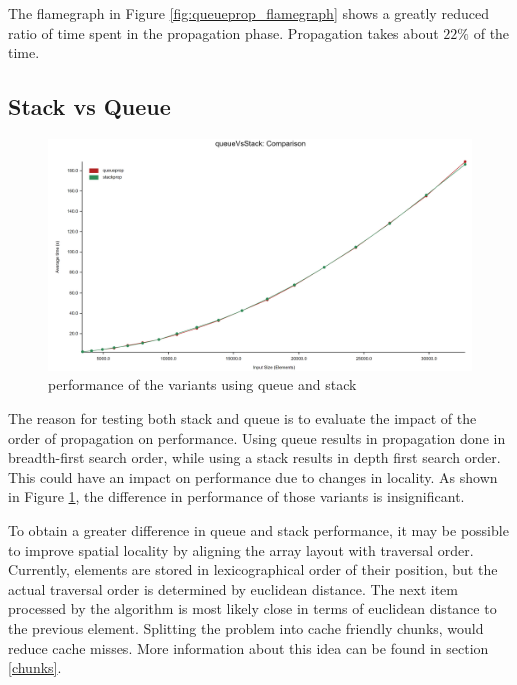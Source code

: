 \documentclass[shortabstract, english, inz]{iithesis}
\begin{document}
The flamegraph in Figure \ref{fig:queueprop_flamegraph} shows a greatly reduced ratio of time spent in the propagation phase. Propagation takes about \(22\%\) of the time.



\subsection{Stack vs Queue}
\begin{figure}[H]
\centering
\includegraphics[width=1\textwidth, angle=0]{images/queue_vs_stack_performance.png}
\caption{performance of the variants using queue and stack}
\label{fig:stack_vs_queue}
\end{figure}
\label{stack_vs_queue}
The reason for testing both stack and queue is to evaluate the impact of the order of propagation on performance. Using queue results in propagation done in breadth-first search order, while using a stack results in depth first search order. This could have an impact on performance due to changes in locality. As shown in Figure \ref{fig:stack_vs_queue}, the difference in performance of those variants is insignificant.

To obtain a greater difference in queue and stack performance, it may be possible to improve spatial locality by aligning the array layout with traversal order. Currently, elements are stored in lexicographical order of their position, but the actual traversal order is determined by euclidean distance. The next item processed by the algorithm is most likely close in terms of euclidean distance to the previous element. Splitting the problem into cache friendly chunks, would reduce cache misses. More information about this idea can be found in section \ref{chunks}.
\end{document}
